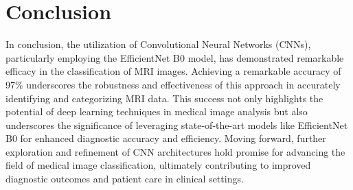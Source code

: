 \documentclass[12pt]{article}
\begin{document}
	\section{Conclusion}
	
In conclusion, the utilization of Convolutional Neural Networks (CNNs), particularly employing the EfficientNet B0 model, has demonstrated remarkable efficacy in the classification of MRI images. Achieving a remarkable accuracy of 97\% underscores the robustness and effectiveness of this approach in accurately identifying and categorizing MRI data. This success not only highlights the potential of deep learning techniques in medical image analysis but also underscores the significance of leveraging state-of-the-art models like EfficientNet B0 for enhanced diagnostic accuracy and efficiency. Moving forward, further exploration and refinement of CNN architectures hold promise for advancing the field of medical image classification, ultimately contributing to improved diagnostic outcomes and patient care in clinical settings.


	
\end{document}
